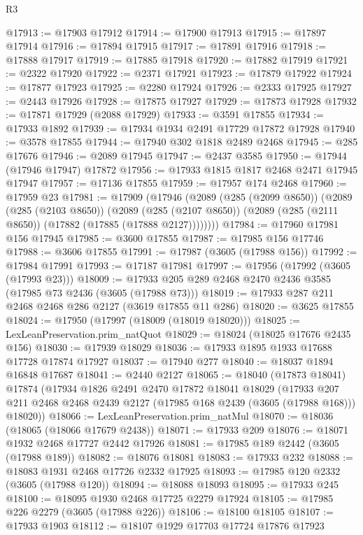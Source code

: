 \begin{lexlean}{R3}
\begin{coremodule}
@17913 := @17903 @17912
@17914 := @17900 @17913
@17915 := @17897 @17914
@17916 := @17894 @17915
@17917 := @17891 @17916
@17918 := @17888 @17917
@17919 := @17885 @17918
@17920 := @17882 @17919
@17921 := @2322 @17920
@17922 := @2371 @17921
@17923 := @17879 @17922
@17924 := @17877 @17923
@17925 := @2280 @17924
@17926 := @2333 @17925
@17927 := @2443 @17926
@17928 := @17875 @17927
@17929 := @17873 @17928
@17932 := @17871 @17929 (@2088 @17929)
@17933 := @3591 @17855
@17934 := @17933 @1892
@17939 := @17934 @1934 @2491 @17729 @17872 @17928
@17940 := @3578 @17855
@17944 := @17940 @302 @1818 @2489 @2468
@17945 := @285 @17676
@17946 := @2089 @17945
@17947 := @2437 @3585
@17950 := @17944 (@17946 @17947) @17872
@17956 := @17933 @1815 @1817 @2468 @2471 @17945 @17947
@17957 := @17136 @17855
@17959 := @17957 @174 @2468
@17960 := @17959 @23
@17981 := @17909
    (@17946
      (@2089
        (@285 (@2099 @8650))
        (@2089
          (@285 (@2103 @8650))
          (@2089
            (@285 (@2107 @8650))
            (@2089 (@285 (@2111 @8650)) (@17882 (@17885 (@17888 @2127))))))))
@17984 := @17960 @17981 @156 @17945
@17985 := @3600 @17855
@17987 := @17985 @156 @17746
@17988 := @3606 @17855
@17991 := @17987 (@3605 (@17988 @156))
@17992 := @17984 @17991
@17993 := @17187 @17981
@17997 := @17956 (@17992 (@3605 (@17993 @23)))
@18009 := @17933 @205 @289 @2468 @2470 @2436 @3585 (@17985 @73 @2436 (@3605 (@17988 @73)))
@18019 := @17933 @287 @211 @2468 @2468 @286 @2127 (@3619 @17855 @11 @286)
@18020 := @3625 @17855
@18024 := @17950 (@17997 (@18009 (@18019 @18020)))
@18025 := LexLeanPreservation.prim_natQuot
@18029 := @18024 (@18025 @17676 @2435 @156)
@18030 := @17939 @18029
@18036 := @17933 @1895 @1933 @17688 @17728 @17874 @17927
@18037 := @17940 @277
@18040 := @18037 @1894 @16848 @17687
@18041 := @2440 @2127
@18065 := @18040
    (@17873 @18041)
    @17874
    (@17934
      @1826
      @2491
      @2470
      @17872
      @18041
      @18029
      (@17933 @207 @211 @2468 @2468 @2439 @2127 (@17985 @168 @2439 (@3605 (@17988 @168))) @18020))
@18066 := LexLeanPreservation.prim_natMul
@18070 := @18036 (@18065 (@18066 @17679 @2438))
@18071 := @17933 @209
@18076 := @18071 @1932 @2468 @17727 @2442 @17926
@18081 := @17985 @189 @2442 (@3605 (@17988 @189))
@18082 := @18076 @18081
@18083 := @17933 @232
@18088 := @18083 @1931 @2468 @17726 @2332 @17925
@18093 := @17985 @120 @2332 (@3605 (@17988 @120))
@18094 := @18088 @18093
@18095 := @17933 @245
@18100 := @18095 @1930 @2468 @17725 @2279 @17924
@18105 := @17985 @226 @2279 (@3605 (@17988 @226))
@18106 := @18100 @18105
@18107 := @17933 @1903
@18112 := @18107 @1929 @17703 @17724 @17876 @17923

\end{coremodule}
\end{lexlean}
